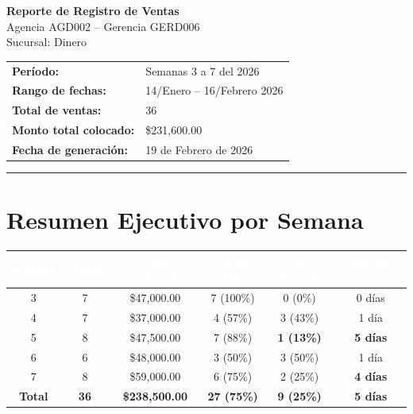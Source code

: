 \documentclass[11pt,a4paper]{article}
\begin{document}
\begin{center}
\vspace*{2cm}
{\Huge\textcolor{headerblue}{\textbf{Reporte de Registro de Ventas}}}\\[0.5cm]
{\LARGE Agencia AGD002 -- Gerencia GERD006}\\[0.3cm]
{\large Sucursal: Dinero}\\[1.5cm]

\begin{tabular}{ll}
\textbf{Per\'iodo:} & Semanas 3 a 7 del 2026 \\
\textbf{Rango de fechas:} & 14/Enero -- 16/Febrero 2026 \\
\textbf{Total de ventas:} & 36 \\
\textbf{Monto total colocado:} & \$231,600.00 \\
\textbf{Fecha de generaci\'on:} & 19 de Febrero de 2026 \\
\end{tabular}

\vspace{2cm}
\rule{0.8\textwidth}{0.5pt}
\end{center}

\newpage

\section*{\textcolor{headerblue}{Resumen Ejecutivo por Semana}}

\begin{center}
\renewcommand{\arraystretch}{1.4}
\begin{tabular}{|c|c|c|c|c|c|}
\hline
\rowcolor{headerblue}
\textcolor{white}{\textbf{Semana}} &
\textcolor{white}{\textbf{Ventas}} &
\textcolor{white}{\textbf{Monto Colocado}} &
\textcolor{white}{\textbf{Mismo D\'ia}} &
\textcolor{white}{\textbf{Con Retraso}} &
\textcolor{white}{\textbf{Retraso M\'ax}} \\
\hline
3 & 7 & \$47,000.00 & 7 (100\%) & 0 (0\%) & 0 d\'ias \\
\hline
\rowcolor{lightgray}
4 & 7 & \$37,000.00 & 4 (57\%) & 3 (43\%) & 1 d\'ia \\
\hline
5 & 8 & \$47,500.00 & 7 (88\%) & \textcolor{alertred}{\textbf{1 (13\%)}} & \textcolor{alertred}{\textbf{5 d\'ias}} \\
\hline
\rowcolor{lightgray}
6 & 6 & \$48,000.00 & 3 (50\%) & 3 (50\%) & 1 d\'ia \\
\hline
7 & 8 & \$59,000.00 & 6 (75\%) & 2 (25\%) & \textcolor{alertred}{\textbf{4 d\'ias}} \\
\hline
\hline
\textbf{Total} & \textbf{36} & \textbf{\$238,500.00} & \textbf{27 (75\%)} & \textbf{9 (25\%)} & \textbf{5 d\'ias} \\
\hline
\end{tabular}
\end{center}
\end{document}
